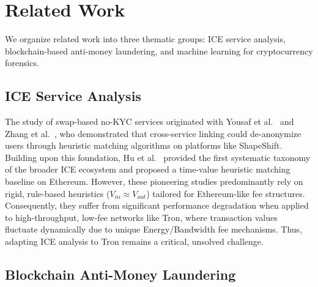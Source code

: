 \documentclass[journal]{IEEEtran}
\begin{document}
    \section{Related Work}
    \label{sec:related}
    
    We organize related work into three thematic groups: ICE service analysis, blockchain-based anti-money laundering, and machine learning for cryptocurrency forensics.
    
    \subsection{ICE Service Analysis}
    The study of swap-based no-KYC services originated with Yousaf et al.~\cite{yousaf2019tracing} and Zhang et al.~\cite{zhang2020heuristic}, who demonstrated that cross-service linking could de-anonymize users through heuristic matching algorithms on platforms like ShapeShift. Building upon this foundation, Hu et al.~\cite{hu2024ice} provided the first systematic taxonomy of the broader ICE ecosystem and proposed a time-value heuristic matching baseline on Ethereum. However, these pioneering studies predominantly rely on rigid, rule-based heuristics ($V_{in} \approx V_{out}$) tailored for Ethereum-like fee structures. Consequently, they suffer from significant performance degradation when applied to high-throughput, low-fee networks like Tron, where transaction values fluctuate dynamically due to unique Energy/Bandwidth fee mechanisms. Thus, adapting ICE analysis to Tron remains a critical, unsolved challenge.
    
    \subsection{Blockchain Anti-Money Laundering}
    
\end{document}
